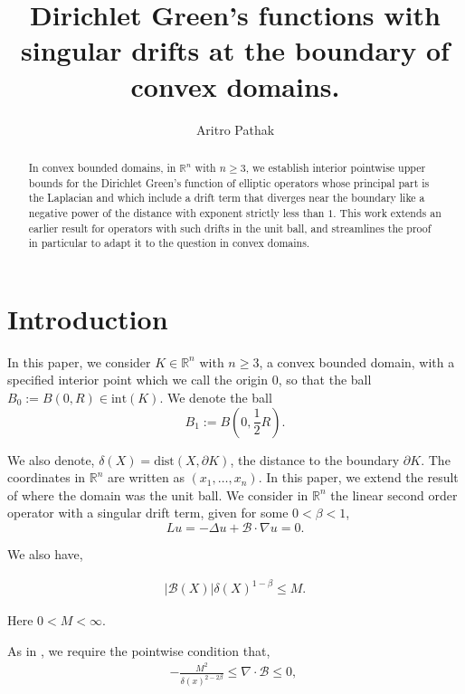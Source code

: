 \documentclass{article}
\title{Dirichlet Green's functions with singular drifts at the boundary of convex domains.}
\author{Aritro Pathak}
\theoremstyle{plain}
\theoremstyle{definition}
\theoremstyle{plain}
\newcommand{\R}{\mathbb{R}}
\newcommand{\B}{\mathcal{B}}
\begin{document}
\maketitle

\begin{abstract}
In convex bounded domains, in $\R^{n}$ with $n\geq 3$, we establish interior pointwise upper bounds for the Dirichlet Green’s function of elliptic operators whose principal part is the Laplacian and which include a drift term that diverges near the boundary like a negative power of the distance with exponent strictly less than $1$. This work extends an earlier result for operators with such drifts in the unit ball, and streamlines the proof in particular to adapt it to the question in convex domains.
\end{abstract}


\section{Introduction}


          
In this paper, we consider $K\in\R^{n}$ with $n\geq 3$, a convex bounded domain, with a specified interior point which we call the origin $0$, so that the ball $B_0:=B(0, R)\in \text{int}(K)$. We denote the ball $$B_1:=B(0,\frac{1}{2}R).$$ 

We also denote, $\delta(X)=\text{dist}(X,\partial K)$, the distance to the boundary $\partial K$. The coordinates in $\R^{n}$ are written as $(x_1,\dots,x_n)$. In this paper, we extend the result of \cite{Pat25} where the domain was the unit ball. We consider in $\R^{n}$ the linear second order operator with a singular drift term, given for some $0<\beta<1$, 
\begin{equation}\label{Laplacian}
    L u=-\Delta u+\B\cdot \nabla u =0.
\end{equation}

We also have, 

 \begin{align}\label{driftt}
     |\B(X)|\delta(X)^{1-\beta}\leq M.
\end{align}

 Here $0< M<\infty$.


   
 As in \cite{Pat25}, we require the pointwise condition that, 
     \begin{align}\label{nonpositivee}
         -\frac{M^2}{\delta(x)^{2-2\beta}}\leq \nabla\cdot \B\leq 0, \ 
     \end{align}
     
\end{document}
